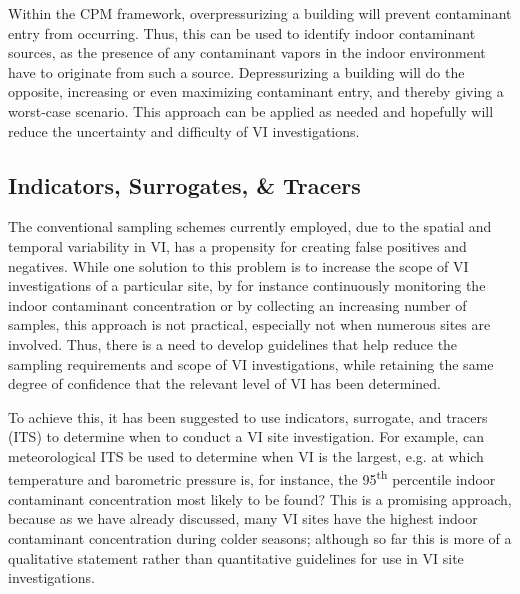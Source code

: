 Within the CPM framework, overpressurizing a building will prevent contaminant entry from occurring.
Thus, this can be used to identify indoor contaminant sources, as the presence of any contaminant vapors in the indoor environment have to originate from such a source.
Depressurizing a building will do the opposite, increasing or even maximizing contaminant entry, and thereby giving a worst-case scenario.
This approach can be applied as needed and hopefully will reduce the uncertainty and difficulty of VI investigations\cite{mchugh_evaluation_2012}.\par

\subsection{Indicators, Surrogates, \& Tracers}

The conventional sampling schemes currently employed, due to the spatial and temporal variability in VI, has a propensity for creating false positives and negatives.
While one solution to this problem is to increase the scope of VI investigations of a particular site, by for instance continuously monitoring the indoor contaminant concentration or by collecting an increasing number of samples, this approach is not practical, especially not when numerous sites are involved.
Thus, there is a need to develop guidelines that help reduce the sampling requirements and scope of VI investigations, while retaining the same degree of confidence that the relevant level of VI has been determined\cite{schuver_chlorinated_2018}.\par

To achieve this, it has been suggested to use indicators, surrogate, and tracers (ITS) to determine when to conduct a VI site investigation.
For example, can meteorological ITS be used to determine when VI is the largest, e.g. at which temperature and barometric pressure is, for instance, the 95\textsuperscript{th} percentile indoor contaminant concentration most likely to be found\cite{schuver_chlorinated_2018}?
This is a promising approach, because as we have already discussed, many VI sites have the highest indoor contaminant concentration during colder seasons; although so far this is more of a qualitative statement rather than quantitative guidelines for use in VI site investigations.\par
